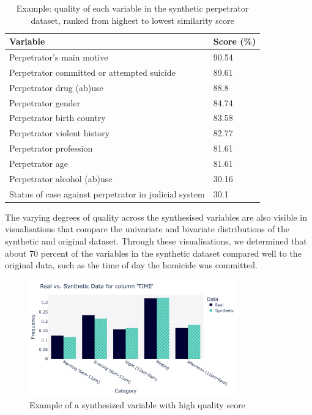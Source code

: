 \vspace{10pt}

\vspace{10pt}
\begin{table}[H]
\small
\centering
\begin{tabular}{@{}ll@{}}
\toprule
Variable                                              & Score (\%)   \\ \midrule
Perpetrator's main motive                             & 90.54 \\
Perpetrator committed or attempted suicide            & 89.61 \\
Perpetrator drug (ab)use                              & 88.8  \\
Perpetrator gender                                    & 84.74 \\
Perpetrator birth country                             & 83.58 \\
Perpetrator violent history                           & 82.77 \\
Perpetrator profession                                & 81.61 \\
Perpetrator age                                       & 81.61 \\
Perpetrator alcohol (ab)use                           & 30.16 \\
Status of case against perpetrator in judicial system & 30.1 \\ \bottomrule
\end{tabular}
\caption{Example: quality of each variable in the synthetic perpetrator dataset, ranked from highest to lowest similarity score}
\label{tab:my-table}
\end{table}
\vspace{10pt}

The varying degrees of quality across the synthesised variables are also visible in visualisations that compare the univariate and bivariate distributions of the synthetic and original dataset. Through these visualisations, we determined that about 70 percent of the variables in the synthetic dataset compared well to the original data, such as the time of day the homicide was committed.

\vspace{10pt}
\begin{figure}[H]
    \centering
    \includegraphics[width=0.8\textwidth]{Images/timefirst.png}
    \caption{Example of a synthesized variable with high quality score}
    \label{fig:proof_1}
\end{figure}
\vspace{10pt}

